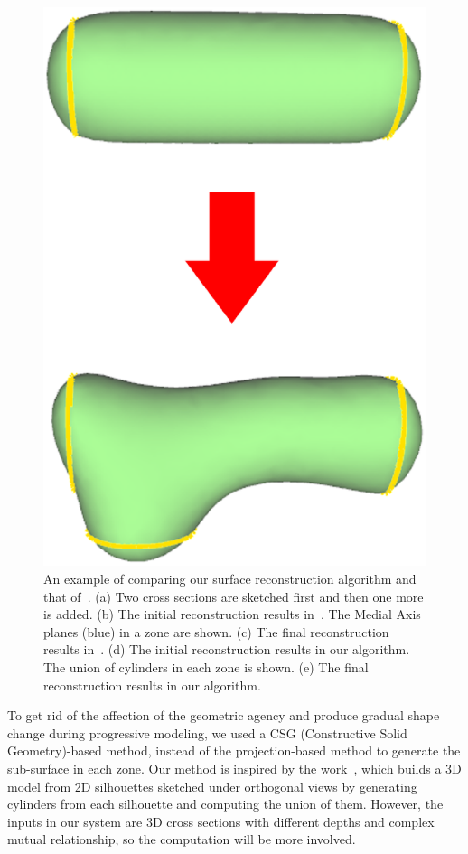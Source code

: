 \begin{figure} [htbp]
{\begin{minipage}[b]{0.18\textwidth}
      \includegraphics[scale=0.12]{figs/f3.surf-csgma-5.eps}
    \end{minipage}}
  \caption{An example of comparing our surface reconstruction algorithm  and that of~\cite{LBDLJ08}.
  (a) Two cross sections are sketched first and then one more is added.
  (b) The initial reconstruction results in~\cite{LBDLJ08}. The Medial Axis planes (blue) in a zone are shown.
  (c) The final reconstruction results in~\cite{LBDLJ08}.
  (d) The initial reconstruction results in our algorithm. The union of cylinders in each zone is shown.
  (e) The final reconstruction results in our algorithm.}
  \label{fig:csgma} %
\end{figure}

To get rid of the affection of the geometric agency and produce
gradual shape change during progressive modeling, we used a CSG
(Constructive Solid Geometry)-based method, instead of the
projection-based method to generate the sub-surface in each zone.
Our method is inspired by the work~\cite{RDI10}, which builds a 3D
model from 2D silhouettes sketched under orthogonal views by
generating cylinders from each silhouette and computing the union of
them. However, the inputs in our system are 3D cross sections with
different depths and complex mutual relationship, so the computation
will be more involved.

